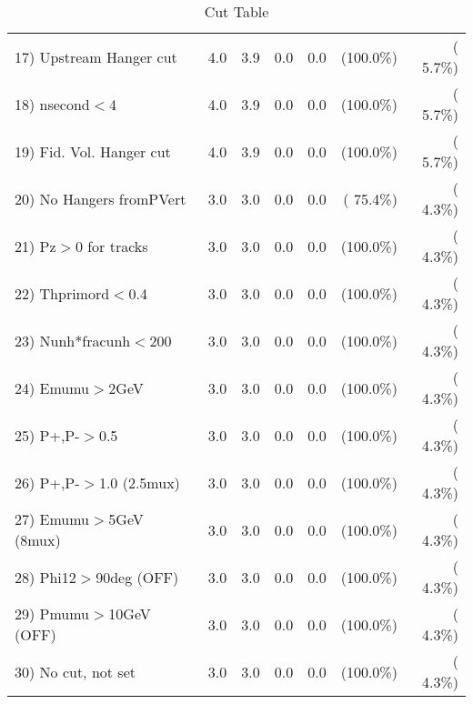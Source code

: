 \begin{table}[h!]
\begin{tabular}{||l||r|r|r|r|r|r||}
 17) Upstream Hanger cut  &          4.0 &          3.9 &          0.0 &          0.0 & (100.0\%) & (  5.7\%) \\
 18) nsecond$<$4          &          4.0 &          3.9 &          0.0 &          0.0 & (100.0\%) & (  5.7\%) \\
 19) Fid. Vol. Hanger cut &          4.0 &          3.9 &          0.0 &          0.0 & (100.0\%) & (  5.7\%) \\
 20) No Hangers fromPVert &          3.0 &          3.0 &          0.0 &          0.0 & ( 75.4\%) & (  4.3\%) \\
 21) Pz$>$0 for tracks    &          3.0 &          3.0 &          0.0 &          0.0 & (100.0\%) & (  4.3\%) \\
 22) Thprimord$<$0.4      &          3.0 &          3.0 &          0.0 &          0.0 & (100.0\%) & (  4.3\%) \\
 23) Nunh*fracunh$<$200   &          3.0 &          3.0 &          0.0 &          0.0 & (100.0\%) & (  4.3\%) \\
 24) Emumu$>$2GeV         &          3.0 &          3.0 &          0.0 &          0.0 & (100.0\%) & (  4.3\%) \\
 25) P+,P-$>$0.5          &          3.0 &          3.0 &          0.0 &          0.0 & (100.0\%) & (  4.3\%) \\
 26) P+,P-$>$1.0 (2.5mux) &          3.0 &          3.0 &          0.0 &          0.0 & (100.0\%) & (  4.3\%) \\
 27) Emumu$>$5GeV  (8mux) &          3.0 &          3.0 &          0.0 &          0.0 & (100.0\%) & (  4.3\%) \\
 28) Phi12$>$90deg  (OFF) &          3.0 &          3.0 &          0.0 &          0.0 & (100.0\%) & (  4.3\%) \\
 29) Pmumu$>$10GeV  (OFF) &          3.0 &          3.0 &          0.0 &          0.0 & (100.0\%) & (  4.3\%) \\
 30) No cut, not set      &          3.0 &          3.0 &          0.0 &          0.0 & (100.0\%) & (  4.3\%) \\
 \hline
 \hline
 \end{tabular}
 \caption{Cut Table           }
 \label{tab-cutcohjpsi-mumu_anuecc}
 \end{table}
